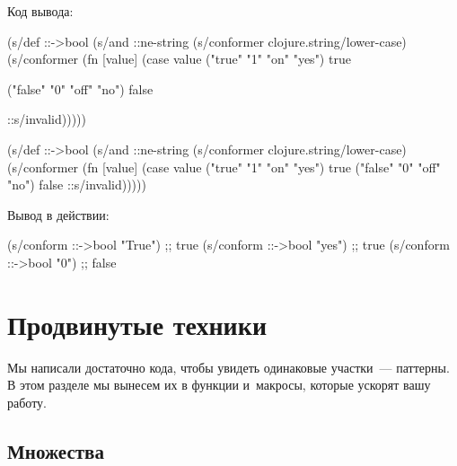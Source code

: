 \noindent
Код вывода:

\ifx\DEVICETYPE\MOBILE

\begin{english}
  \begin{clojure}
(s/def ::->bool
  (s/and
   ::ne-string
   (s/conformer
     clojure.string/lower-case)
   (s/conformer
    (fn [value]
      (case value
        ("true" "1" "on" "yes")
        true

        ("false" "0" "off" "no")
        false

        ::s/invalid)))))

  \end{clojure}
\end{english}

\else

\begin{english}
  \begin{clojure}
(s/def ::->bool
  (s/and
   ::ne-string
   (s/conformer clojure.string/lower-case)
   (s/conformer
    (fn [value]
      (case value
        ("true" "1" "on" "yes") true
        ("false" "0" "off" "no") false
        ::s/invalid)))))

  \end{clojure}
\end{english}

\fi

\noindent
Вывод в действии:

\begin{english}
  \begin{clojure}
(s/conform ::->bool "True") ;; true
(s/conform ::->bool "yes")  ;; true
(s/conform ::->bool "0")    ;; false
  \end{clojure}
\end{english}

\section{Продвинутые техники}


Мы написали достаточно кода, чтобы увидеть одинаковые участки~--- паттерны. В
этом разделе мы вынесем их в функции и~макросы, которые ускорят вашу работу.

\subsection{Множества}



